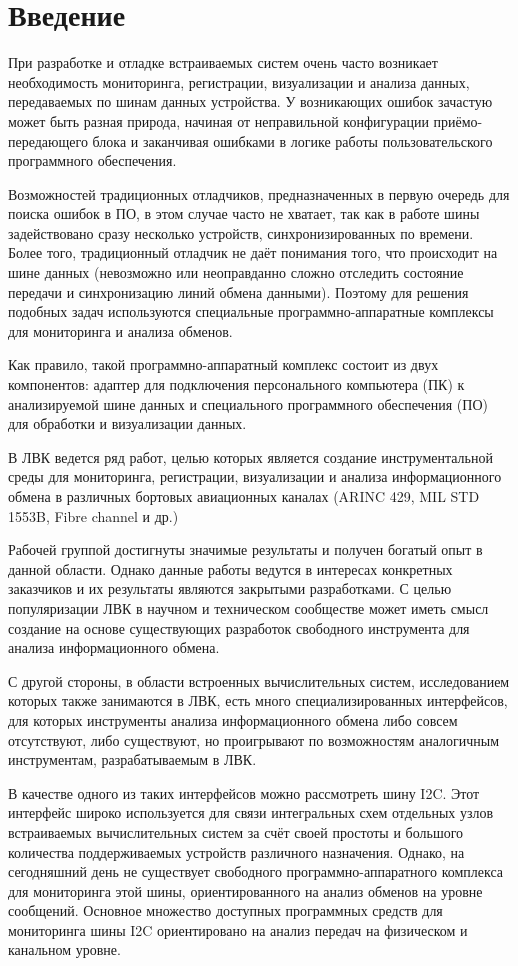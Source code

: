 \section{Введение}

При разработке и отладке встраиваемых систем очень часто возникает необходимость мониторинга, регистрации, визуализации и анализа данных, передаваемых по шинам данных устройства. У возникающих ошибок зачастую может быть разная природа, начиная от неправильной конфигурации приёмо-передающего блока и заканчивая ошибками в логике работы пользовательского программного обеспечения.

Возможностей традиционных отладчиков, предназначенных в первую очередь для поиска ошибок в ПО, в этом случае часто не хватает, так как в работе шины задействовано сразу несколько устройств, синхронизированных по времени. Более того, традиционный отладчик не даёт понимания того, что происходит на шине данных (невозможно или неоправданно сложно отследить состояние передачи и синхронизацию линий обмена данными). Поэтому для решения подобных задач используются специальные программно-аппаратные комплексы для мониторинга и анализа обменов.

Как правило, такой программно-аппаратный комплекс состоит из двух компонентов: адаптер для подключения персонального компьютера (ПК) к анализируемой шине данных и специального программного обеспечения (ПО) для обработки и визуализации данных.

В ЛВК ведется ряд работ, целью которых является создание инструментальной среды для мониторинга, регистрации, визуализации и анализа информационного обмена в различных бортовых авиационных каналах (ARINC 429, MIL STD 1553B, Fibre channel и др.)

Рабочей группой достигнуты значимые результаты и получен богатый опыт в данной области. Однако данные работы ведутся в интересах конкретных заказчиков и их результаты являются закрытыми разработками. С целью популяризации ЛВК в научном и техническом сообществе может иметь смысл создание на основе существующих разработок свободного инструмента для анализа информационного обмена.

С другой стороны, в области встроенных вычислительных систем, исследованием которых также занимаются в ЛВК, есть много специализированных интерфейсов, для которых инструменты анализа информационного обмена либо совсем отсутствуют, либо существуют, но проигрывают по возможностям аналогичным инструментам, разрабатываемым в ЛВК.

В качестве одного из таких интерфейсов можно рассмотреть шину I2C. Этот интерфейс широко используется для связи интегральных схем отдельных узлов встраиваемых вычислительных систем за счёт своей простоты и большого количества поддерживаемых устройств различного назначения. Однако, на сегодняшний день не существует свободного программно-аппаратного комплекса для мониторинга этой шины, ориентированного на анализ обменов на уровне сообщений. Основное множество доступных программных средств для мониторинга шины I2C ориентировано на анализ передач на физическом и канальном уровне.

